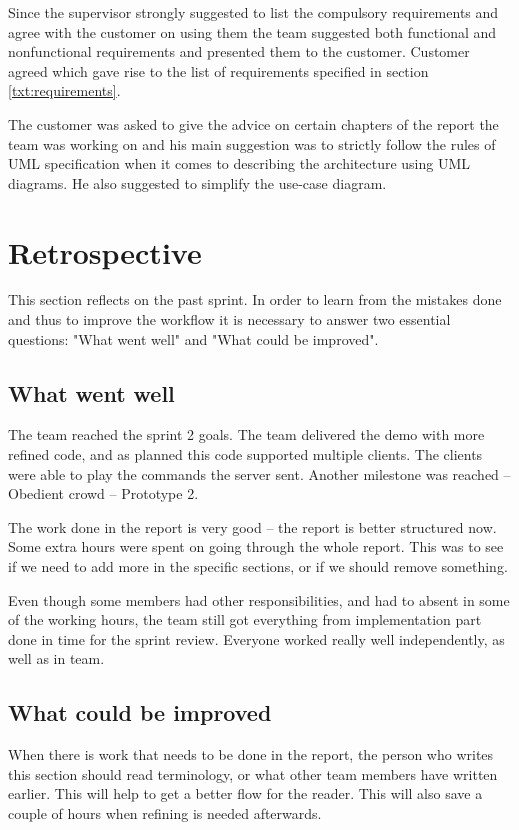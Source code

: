 Since the supervisor strongly suggested to list the compulsory requirements and agree with the customer on using them the team suggested both functional and nonfunctional requirements and presented them to the customer. Customer agreed which gave rise to the list of requirements specified in section \ref{txt:requirements}.

The customer was asked to give the advice on certain chapters of the report the team was working on and his main suggestion was to strictly follow the rules of UML specification when it comes to describing the architecture using UML diagrams. He also suggested to simplify the use-case diagram.

\section{Retrospective}
This section reflects on the past sprint. In order to learn from the mistakes done and thus to improve the workflow it is necessary to answer two essential questions: "What went well" and "What could be improved".

\subsection{What went well}
The team reached the sprint 2 goals. 
The team delivered the demo with more refined code, and as planned this code supported multiple clients. 
The clients were able to play the commands the server sent.
Another milestone was reached -- Obedient crowd -- Prototype 2.

The work done in the report is very good -- the report is better structured now.
Some extra hours were spent on going through the whole report. 
This was to see if we need to add more in the specific sections, or if we should remove something.  

Even though some members had other responsibilities, and had to absent in some of the working hours, the team still got everything from implementation part done in time for the sprint review. Everyone worked really well independently, as well as in team. 



\subsection{What could be improved}

When there is work that needs to be done in the report, the person who writes this section should read terminology, or what other team members have written earlier. 
This will help to get a better flow for the reader.
This will also save a couple of hours when refining is needed afterwards. 

